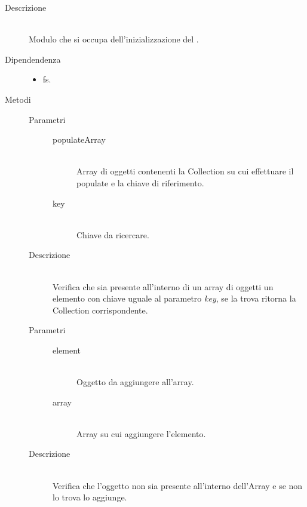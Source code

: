 \begin{description}
 \item[Descrizione] \hfill \\
  Modulo che si occupa dell'inizializzazione del .
 \item[Dipendendenza] \hfill
 \begin{itemize}
  \item{fs}.
 \end{itemize}
  
 \item[Metodi]
 \begin{mldescription}
  \hfill
 \begin{description}
      		\item[Parametri] \hfill
      			\begin{description}
      				\item[populateArray] \hfill \\
      				Array di oggetti contenenti la Collection su cui effettuare il populate e la chiave di riferimento.
      				\item[key] \hfill \\
      				Chiave da ricercare.
      			\end{description}
      		\item[Descrizione] \hfill \\
      		Verifica che sia presente all'interno di un array di oggetti un elemento con chiave uguale al parametro \textit{key}, se la trova ritorna la Collection corrispondente.
    \end{description}
  \hfill
 \begin{description}
      		\item[Parametri] \hfill
      			\begin{description}
      				\item[element] \hfill \\
      				Oggetto da aggiungere all'array.
      			   	\item[array] \hfill \\
      			   	Array su cui aggiungere l'elemento.
      			\end{description}
      		\item[Descrizione] \hfill \\
      		Verifica che l'oggetto non sia presente all'interno dell'Array e se non lo trova lo aggiunge.
    \end{description}

\end{mldescription}
\end{description}
